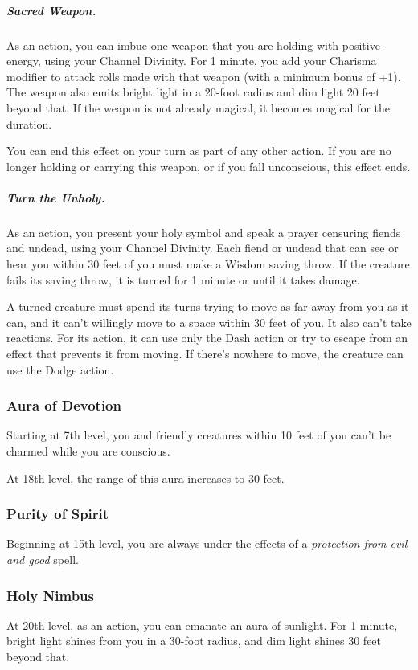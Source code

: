 \subparagraph*{Sacred Weapon.} As an action, you can imbue one weapon that you are holding with positive energy, using your Channel Divinity. For 1 minute, you add your Charisma modifier to attack rolls made with that weapon (with a minimum bonus of +1). The weapon also emits bright light in a 20-foot radius and dim light 20 feet beyond that. If the weapon is not already magical, it becomes magical for the duration.

You can end this effect on your turn as part of any other action. If you are no longer holding or carrying this weapon, or if you fall unconscious, this effect ends.

\subparagraph*{Turn the Unholy.} As an action, you present your holy symbol and speak a prayer censuring fiends and undead, using your Channel Divinity. Each fiend or undead that can see or hear you within 30 feet of you must make a Wisdom saving throw. If the creature fails its saving throw, it is turned for 1 minute or until it takes damage.

A turned creature must spend its turns trying to move as far away from you as it can, and it can’t willingly move to a space within 30 feet of you. It also can’t take reactions. For its action, it can use only the Dash action or try to escape from an effect that prevents it from moving. If there’s nowhere to move, the creature can use the Dodge action.

\subsubsection{Aura of Devotion}

Starting at 7th level, you and friendly creatures within 10 feet of you can’t be charmed while you are conscious.

At 18th level, the range of this aura increases to 30 feet.

\subsubsection{Purity of Spirit}

Beginning at 15th level, you are always under the effects of a \textit{protection from evil and good} spell.

\subsubsection{Holy Nimbus}

At 20th level, as an action, you can emanate an aura of sunlight. For 1 minute, bright light shines from you in a 30-foot radius, and dim light shines 30 feet beyond that.

